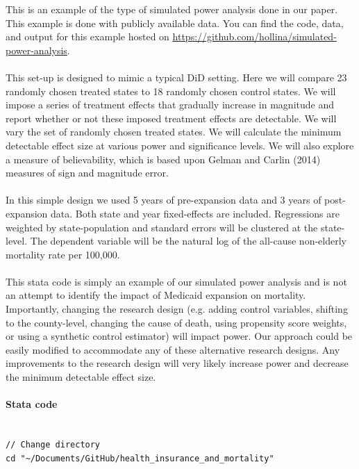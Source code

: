 \documentclass[12pt]{article}%
\begin{document}
\begin{appendices}
This is an example of the type of simulated power analysis done in our paper. This example is done with publicly available data. You can find the code, data, and output for this example hosted on \href{https://github.com/hollina/simulated-power-analysis}{https://github.com/hollina/simulated-power-analysis}.\\
~\\
This set-up is designed to mimic a typical DiD setting. Here we will compare 23 randomly chosen treated states to 18 randomly chosen control states. We will impose a series of treatment effects that gradually increase in magnitude and report whether or not these imposed treatment effects are detectable. We will vary the set of randomly chosen treated states. We will calculate the minimum detectable effect size at various power and significance levels. We will also explore a measure of believability, which is based upon Gelman and Carlin (2014) measures of sign and magnitude error.\\
~\\
In this simple design we used 5 years of pre-expansion data and 3 years of post-expansion data. Both state and year fixed-effects are included. Regressions are weighted by state-population and standard errors will be clustered at the state-level. The dependent variable will be the natural log of the all-cause non-elderly mortality rate per 100,000.\\
~\\
This stata code is simply an example of our simulated power analysis and is not an attempt to identify the impact of Medicaid expansion on mortality. Importantly, changing the research design (e.g. adding control variables, shifting to the county-level, changing the cause of death, using propensity score weights, or using a synthetic control estimator) will impact power. Our approach could be easily modified to accommodate any of these alternative research designs. Any improvements to the research design will very likely increase power and decrease the minimum detectable effect size.

\paragraph{Stata code}
\begin{footnotesize}
\begin{verbatim}
   
// Change directory 
cd "~/Documents/GitHub/health_insurance_and_mortality" 


\end{verbatim}
\end{footnotesize}
\end{appendices}
\end{document}
